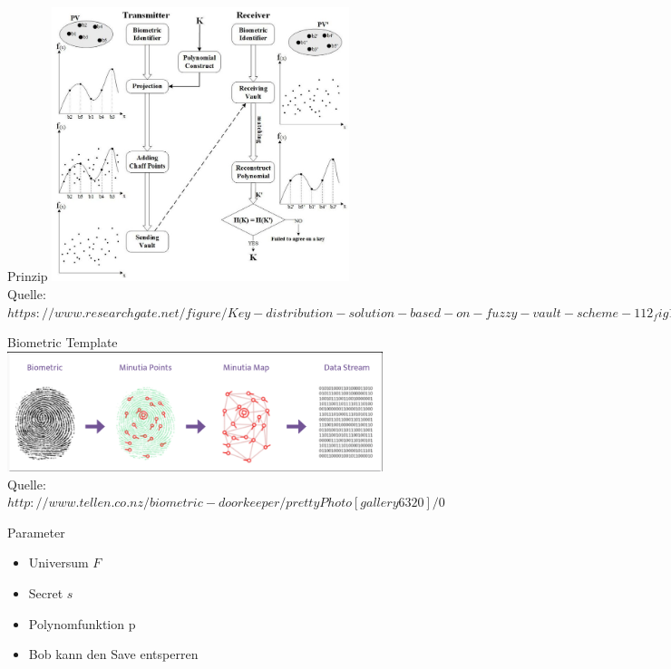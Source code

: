 \documentclass{beamer}
\begin{document}
\begin{frame}{Prinzip}
		\hspace{10mm}\includegraphics [height = 8cm ]{fuzzy_vault.png} \\
		\tiny{Quelle: \textit{\tiny{$https://www.researchgate.net/figure/Key-distribution-solution-based-on-fuzzy-vault-		scheme-112_fig1_321080531/$}}}
\end{frame}

\begin{frame}{Biometric Template}
		\hspace{10mm}\includegraphics [height =3.5cm ]{template.PNG} \\
		\tiny{Quelle: \textit{\tiny{$http://www.tellen.co.nz/biometric-doorkeeper/prettyPhoto[gallery6320]/0$}}}
\end{frame}
\begin{frame}{Parameter}
	\begin{itemize}
		\item Universum $F$\\[1.5 ex]
		\item Secret $s$\\[1.5 ex]
		\item Polynomfunktion p \\[1.5 ex]
		\item Bob kann den Save entsperren
	\end{itemize}
\end{frame}
\end{document}
